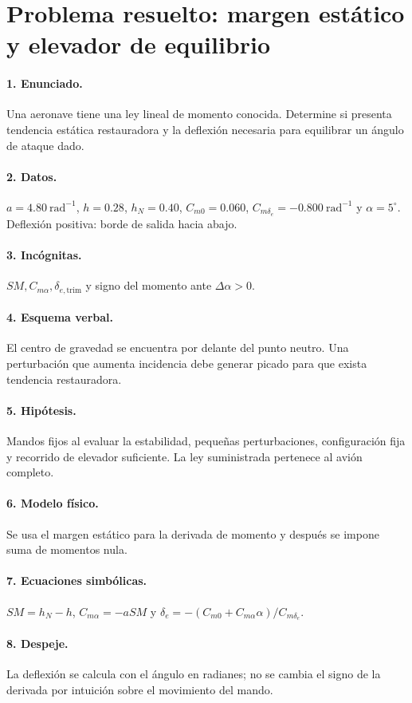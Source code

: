 \section{Problema resuelto: margen estático y elevador de equilibrio}
\paragraph{1. Enunciado.} Una aeronave tiene una ley lineal de momento conocida. Determine si presenta tendencia estática restauradora y la deflexión necesaria para equilibrar un ángulo de ataque dado.
\paragraph{2. Datos.} $a=4.80\ \mathrm{rad^{-1}}$, $h=0.28$, $h_N=0.40$, $C_{m0}=0.060$, $C_{m\delta_e}=-0.800\ \mathrm{rad^{-1}}$ y $\alpha=5^\circ$. Deflexión positiva: borde de salida hacia abajo.
\paragraph{3. Incógnitas.} $SM,C_{m\alpha},\delta_{e,\mathrm{trim}}$ y signo del momento ante $\Delta\alpha>0$.
\paragraph{4. Esquema verbal.} El centro de gravedad se encuentra por delante del punto neutro. Una perturbación que aumenta incidencia debe generar picado para que exista tendencia restauradora.
\paragraph{5. Hipótesis.} Mandos fijos al evaluar la estabilidad, pequeñas perturbaciones, configuración fija y recorrido de elevador suficiente. La ley suministrada pertenece al avión completo.
\paragraph{6. Modelo físico.} Se usa el margen estático para la derivada de momento y después se impone suma de momentos nula.
\paragraph{7. Ecuaciones simbólicas.} $SM=h_N-h$, $C_{m\alpha}=-aSM$ y $\delta_e=-(C_{m0}+C_{m\alpha}\alpha)/C_{m\delta_e}$.
\paragraph{8. Despeje.} La deflexión se calcula con el ángulo en radianes; no se cambia el signo de la derivada por intuición sobre el movimiento del mando.

